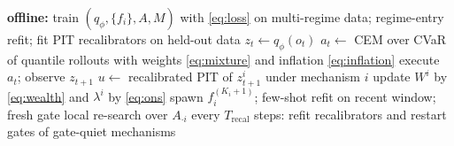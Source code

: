 \documentclass[preprint,12pt]{elsarticle}
\theoremstyle{definition}
\theoremstyle{remark}
\begin{document}
\begin{algorithm}[t]
\caption{CAIRN deployment loop}\label{alg:deploy}
\begin{algorithmic}[1]
\State \textbf{offline:} train $(q_\phi,\{f_i\},A,M)$ with
\eqref{eq:loss} on multi-regime data; regime-entry refit; fit PIT
recalibrators on held-out data
  \State $z_t\gets q_\phi(o_t)$
  \State $a_t\gets$ CEM over CVaR of quantile rollouts with weights
  \eqref{eq:mixture} and inflation \eqref{eq:inflation}
  \State execute $a_t$; observe $z_{t+1}$
    \State $u\gets$ recalibrated PIT of $z^i_{t+1}$ under mechanism $i$
    \State update $W^i$ by \eqref{eq:wealth} and $\lambda^i$ by
    \eqref{eq:ons}
     
      \State spawn $f_i^{(K_i+1)}$; few-shot refit on recent window;
      fresh gate
       local re-search over $A_{\cdot i}$
      \EndIf
    \EndIf
  \EndFor
  \State every $T_{\mathrm{recal}}$ steps: refit recalibrators and restart
  gates of gate-quiet mechanisms 
\EndFor
\end{algorithmic}
\end{algorithm}
\end{document}
